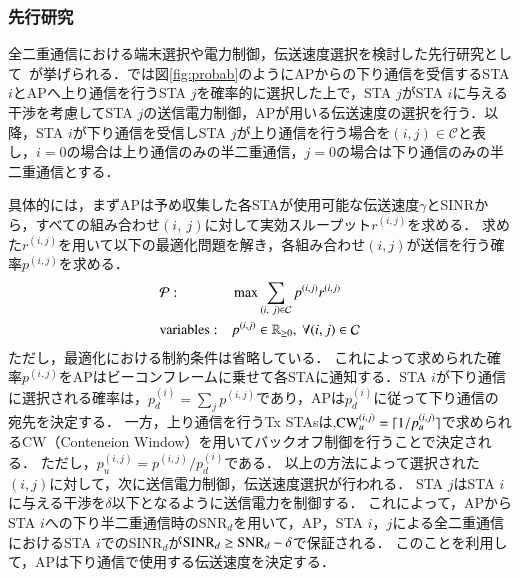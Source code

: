 \documentclass[technicalreport]{ieicej}
\begin{document}
		\subsubsection{先行研究}
		全二重通信における端末選択や電力制御，伝送速度選択を検討した先行研究として~\cite{pro-mac}が挙げられる．\cite{pro-mac}では図\ref{fig:probab}のようにAPからの下り通信を受信するSTA $i$とAPへ上り通信を行うSTA $j$を確率的に選択した上で，STA $j$がSTA $i$に与える干渉を考慮してSTA $j$の送信電力制御，APが用いる伝送速度の選択を行う．以降，STA $i$が下り通信を受信しSTA $j$が上り通信を行う場合を$(i,j)\in{\mathcal C}$と表し，$i=0$の場合は上り通信のみの半二重通信，$j=0$の場合は下り通信のみの半二重通信とする．
		\par
		具体的には，まずAPは予め収集した各STAが使用可能な伝送速度$\gamma$とSINRから，すべての組み合わせ$(i,\ j)$に対して実効スループット$r^{(i,j)}$を求める．
		求めた$r^{(i,j)}$を用いて以下の最適化問題を解き，各組み合わせ$(i,j)$が送信を行う確率$p^{(i,j)}$を求める．
		\begin{align}
			&{\mathcal P}: &&\max \sum_{(i,\ j)\in{\mathcal C}}p^{(i,j)}r^{(i,j)} \label{eq:saiteki}\\
			&{\rm variables}: &&p^{(i,j)} \in {\mathbb R}_{\geq 0},\ \forall(i,j)\in{\mathcal C}
		\end{align}
		ただし，最適化における制約条件は省略している．
		これによって求められた確率$p^{(i,j)}$をAPはビーコンフレームに乗せて各STAに通知する．STA $i$が下り通信に選択される確率は，$p_d^{(i)}=\sum_{j}p^{(i,j)}$であり，APは$p_d^{(i)}$に従って下り通信の宛先を決定する．
		一方，上り通信を行うTx STAsは,${\rm CW}_u^{(i,j)}=\lceil 1/p_u^{(i,j)}\rceil$で求められるCW（Conteneion Window）を用いてバックオフ制御を行うことで決定される．
		ただし，$p_u^{(i,j)}= p^{(i,j)}/p_d^{(i)}$である．
		以上の方法によって選択された$(i,j)$に対して，次に送信電力制御，伝送速度選択が行われる．
		STA $j$はSTA $i$に与える干渉を$\delta$以下となるように送信電力を制御する．
		これによって，APからSTA $i$への下り半二重通信時のSNR$_d$を用いて，AP，STA $i$，$j$による全二重通信におけるSTA $i$でのSINR$_d$が${\rm SINR}_d \geq {\rm SNR}_d - \delta$で保証される．
		このことを利用して，APは下り通信で使用する伝送速度を決定する．
\end{document}
